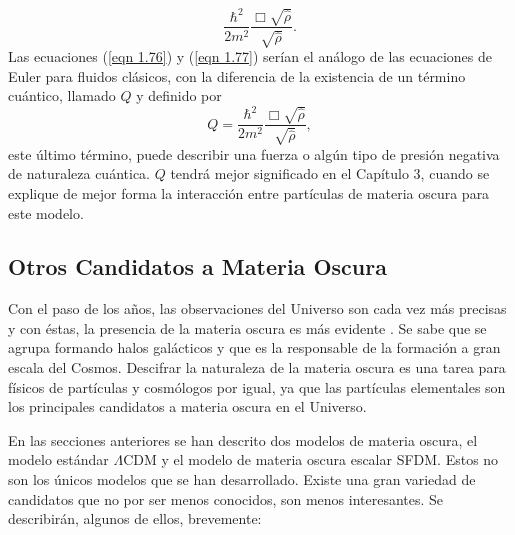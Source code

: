 \documentclass[a4paper,openright,12pt]{book}
\begin{document}
\begin{equation*}
\frac{\hbar^{2}}{2m^{2}}\frac{\Box\sqrt{\hat{\rho}}}{\sqrt{\hat{\rho}}}.
\end{equation*}
Las ecuaciones (\ref{eqn 1.76}) y (\ref{eqn 1.77}) serían el análogo de las ecuaciones de Euler para fluidos clásicos, con la diferencia de la existencia de un término cuántico, llamado $Q$ y definido por
\begin{equation}
Q = \frac{\hbar^{2}}{2m^{2}}\frac{\Box\sqrt{\hat{\rho}}}{\sqrt{\hat{\rho}}},\label{eqn 1.78}
\end{equation}
este último término, puede describir una fuerza o algún tipo de presión negativa de naturaleza cuántica. $Q$ tendrá mejor significado en el Capítulo 3, cuando se explique de mejor forma la interacción entre partículas de materia oscura para este modelo.
\subsection{Otros Candidatos a Materia Oscura}
Con el paso de los años, las observaciones del Universo son cada vez más precisas y con éstas, la presencia de la materia oscura es más evidente \cite{1.3.2.1}. Se sabe que se agrupa formando halos galácticos y que es la responsable de la formación a gran escala del Cosmos. Descifrar la naturaleza de la materia oscura es una tarea para físicos de partículas y cosmólogos por igual, ya que las partículas elementales son los principales candidatos a materia oscura en el Universo. 

En las secciones anteriores se han descrito dos modelos de materia oscura, el modelo estándar $\Lambda$CDM y el modelo de materia oscura escalar SFDM. Estos no son los únicos modelos que se han desarrollado. Existe una gran variedad de candidatos que no por ser menos conocidos, son menos interesantes. Se describirán, algunos de ellos, brevemente:
\end{document}
